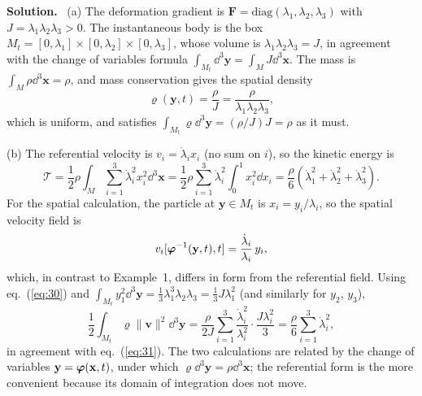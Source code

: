 \documentclass[a4paper,12pt]{paper}
\newenvironment{solution}{\par\noindent\textbf{Solution.}\ }{\par\medskip}
\begin{document}
\begin{solution}
(a) The deformation gradient is $\mathbf{F}=\mathrm{diag}(\lambda_{1},\lambda_{2},\lambda_{3})$
with $J=\lambda_{1}\lambda_{2}\lambda_{3}>0$. The instantaneous body is the box
$M_{t}=[0,\lambda_{1}]\times[0,\lambda_{2}]\times[0,\lambda_{3}]$, whose volume is
$\lambda_{1}\lambda_{2}\lambda_{3}=J$, in agreement with the change of variables formula
$\int_{M_{t}}\dd^{3}\mathbf{y}=\int_{M}J\dd^{3}\mathbf{x}$. The mass is
$\int_{M}\rho\dd^{3}\mathbf{x}=\rho$, and mass conservation gives the spatial density
\begin{equation}
\varrho(\mathbf{y},t)=\frac{\rho}{J}=\frac{\rho}{\lambda_{1}\lambda_{2}\lambda_{3}},
\label{eq:30}
\end{equation}
which is uniform, and satisfies $\int_{M_{t}}\varrho\dd^{3}\mathbf{y}=(\rho/J)J=\rho$ as it
must.

(b) The referential velocity is $v_{i}=\dot{\lambda}_{i}x_{i}$ (no sum on $i$), so the
kinetic energy is
\begin{equation}
\mathcal{T}=\frac{1}{2}\rho\int_{M}\sum_{i=1}^{3}\dot{\lambda}_{i}^{2}x_{i}^{2}\dd^{3}\mathbf{x}
=\frac{1}{2}\rho\sum_{i=1}^{3}\dot{\lambda}_{i}^{2}\int_{0}^{1}x_{i}^{2}\dd x_{i}
=\frac{\rho}{6}\left(\dot{\lambda}_{1}^{2}+\dot{\lambda}_{2}^{2}+\dot{\lambda}_{3}^{2}\right).
\label{eq:31}
\end{equation}
For the spatial calculation, the particle at $\mathbf{y}\in M_{t}$ is
$x_{i}=y_{i}/\lambda_{i}$, so the spatial velocity field is
\begin{equation}
v_{i}[\bm{\varphi}^{-1}(\mathbf{y},t),t]=\frac{\dot{\lambda}_{i}}{\lambda_{i}}\,y_{i},
\label{eq:32}
\end{equation}
which, in contrast to Example~1, differs in form from the referential field. Using
eq.~(\ref{eq:30}) and $\int_{M_{t}}y_{1}^{2}\dd^{3}\mathbf{y}=\tfrac{1}{3}\lambda_{1}^{3}\lambda_{2}\lambda_{3}=\tfrac{1}{3}J\lambda_{1}^{2}$
(and similarly for $y_{2}$, $y_{3}$),
\begin{equation}
\frac{1}{2}\int_{M_{t}}\varrho\|\mathbf{v}\|^{2}\dd^{3}\mathbf{y}
=\frac{\rho}{2J}\sum_{i=1}^{3}\frac{\dot{\lambda}_{i}^{2}}{\lambda_{i}^{2}}\cdot\frac{J\lambda_{i}^{2}}{3}
=\frac{\rho}{6}\sum_{i=1}^{3}\dot{\lambda}_{i}^{2},
\label{eq:33}
\end{equation}
in agreement with eq.~(\ref{eq:31}). The two calculations are related by the change of
variables $\mathbf{y}=\bm{\varphi}(\mathbf{x},t)$, under which $\varrho\dd^{3}\mathbf{y}=\rho\dd^{3}\mathbf{x}$;
the referential form is the more convenient because its domain of integration does not move.
\end{solution}
\end{document}
